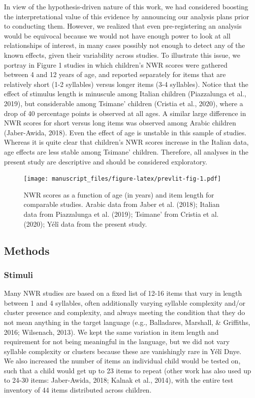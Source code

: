 \documentclass[english,,man,floatsintext]{apa6}
\begin{document}
In view of the hypothesis-driven nature of this work, we had considered
boosting the interpretational value of this evidence by announcing our
analysis plans prior to conducting them. However, we realized that even
pre-registering an analysis would be equivocal because we would not have
enough power to look at all relationships of interest, in many cases
possibly not enough to detect any of the known effects, given their
variability across studies. To illustrate this issue, we portray in
Figure 1 studies in which children's NWR scores were gathered between 4
and 12 years of age, and reported separately for items that are
relatively short (1-2 syllables) versus longer items (3-4 syllables).
Notice that the effect of stimulus length is minuscule among Italian
children (Piazzalunga et al., 2019), but considerable among Tsimane'
children (Cristia et al., 2020), where a drop of 40 percentage points is
observed at all ages. A similar large difference in NWR scores for short
versus long items was observed among Arabic children (Jaber-Awida,
2018). Even the effect of age is unstable in this sample of studies.
Whereas it is quite clear that children's NWR scores increase in the
Italian data, age effects are less stable among Tsimane' children.
Therefore, all analyses in the present study are descriptive and should
be considered exploratory.

\begin{figure}
\centering
\texttt{[image: manuscript\_files/figure-latex/prevlit-fig-1.pdf]}
\caption{\label{fig:prevlit-fig}NWR scores as a function of age (in years)
and item length for comparable studies. Arabic data from Jaber et al.
(2018); Italian data from Piazzalunga et al. (2019); Tsimane' from
Cristia et al. (2020); Yélî data from the present study.}
\end{figure}

\subsection{Methods}\label{methods}

\subsubsection{Stimuli}\label{stimuli}

Many NWR studies are based on a fixed list of 12-16 items that vary in
length between 1 and 4 syllables, often additionally varying syllable
complexity and/or cluster presence and complexity, and always meeting
the condition that they do not mean anything in the target language
(e.g., Balladares, Marshall, \& Griffiths, 2016; Wilsenach, 2013). We
kept the same variation in item length and requirement for not being
meaningful in the language, but we did not vary syllable complexity or
clusters because these are vanishingly rare in Yélî Dnye. We also
increased the number of items an individual child would be tested on,
such that a child would get up to 23 items to repeat (other work has
also used up to 24-30 items: Jaber-Awida, 2018; Kalnak et al., 2014),
with the entire test inventory of 44 items distributed across children.
\end{document}

